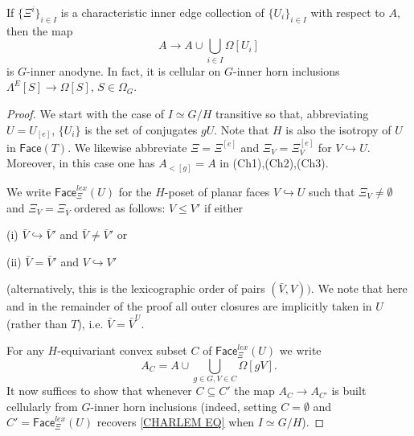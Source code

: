 \documentclass[a4paper,10pt
,draft
]{article}%
\begin{document}
\begin{lemma}\label{CHAREDGE LEM}
If $\{\Xi^i\}_{i \in I}$ is a characteristic inner edge collection of $\{U_i\}_{i\in I}$ with respect to $A$, then the map
	\begin{equation}\label{CHARLEM EQ}
		A \to A \cup \bigcup_{i \in I} \Omega[U_i]
	\end{equation}
is $G$-inner anodyne. In fact, it is cellular on $G$-inner horn inclusions $\Lambda^E[S] \to \Omega[S]$, $S \in \Omega_G$.
\end{lemma}


\begin{proof}
We start with the case of $I \simeq G/H$ transitive so that, abbreviating $U = U_{[e]}$, $\{U_i\}$ is the set of conjugates $gU$. 
Note that $H$ is also the isotropy of $U$ in $\mathsf{Face}(T)$.
We likewise abbreviate $\Xi = \Xi^{[e]}$ and
$\Xi_V = \Xi_V^{[e]}$ for $V \hookrightarrow U$.
Moreover, in this case one has $A_{<[g]}=A$ in (Ch1),(Ch2),(Ch3).

We write $\mathsf{Face}_{\Xi}^{lex}(U)$
for the $H$-poset of planar faces $V \hookrightarrow U$
such that $\Xi_V \neq \emptyset$ and $\Xi_V = \Xi_{\bar{V}}$
ordered as follows: 
$V \leq V'$ if either
	\begin{inparaenum}
		\item[(i)] $\bar{V} \hookrightarrow \bar{V}'$ and 
		$\bar{V} \neq \bar{V}'$ or
		\item[(ii)] $\bar{V} = \bar{V}'$ and
		$V \hookrightarrow V'$
	\end{inparaenum}
(alternatively, this is the lexicographic order of pairs $(\bar{V},V))$.
We note that here and in the remainder of the proof all outer closures are implicitly taken in $U$ (rather than $T$), i.e. 
$\bar{V}=\bar{V}^U$.

For any $H$-equivariant convex subset $C$ of $\mathsf{Face}_{\Xi}^{lex}(U)$ we write
\[
A_C = 
A \cup \bigcup_{g\in G,V \in C} \Omega[gV].
\]
It now suffices to show that whenever
$C \subseteq C'$
the map 
$A_C \to A_{C'}$ is built cellularly from 
$G$-inner horn inclusions
(indeed, setting $C=\emptyset$ and 
$C'=\mathsf{Face}_{\Xi}^{lex}(U)$ recovers \eqref{CHARLEM EQ}
when $I \simeq G/H$).


\end{proof}
\end{document}
